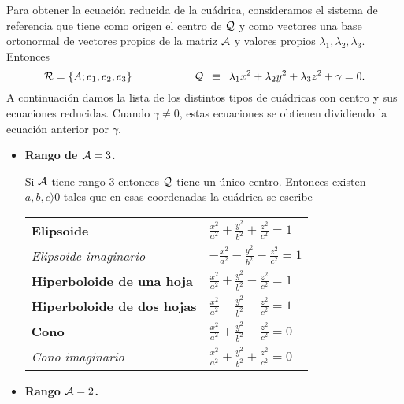 \documentclass[11pt, a4paper]{article}
\newif\IfInSansMode
\theoremstyle{theorem-style}
\theoremstyle{definition-style}
\theoremstyle{remark-style}
\theoremstyle{example-style}
\begin{document}
Para obtener la ecuaci\'on reducida de la cu\'adrica, consideramos el sistema de referencia que tiene como origen el centro de $\cal Q$ y como vectores una base ortonormal de vectores propios de la matriz $\cal A$ y valores propios $\lambda_1,\lambda_2,\lambda_3$. Entonces
\[
{\cal R} =\{A; {e}_1, {e}_2, {e}_3 \}
\hspace{2cm}
{\cal Q} \, \, \, \equiv \, \, \, \lambda_1 {x}^2 +\lambda_2 {y}^2 +\lambda_3 {z}^2 +
{\gamma} = 0.
\]
A continuaci\'on damos la lista de los distintos tipos de cu\'adricas con centro y  sus ecuaciones reducidas. Cuando ${\gamma}\neq 0$, estas ecuaciones se obtienen dividiendo la ecuaci\'on anterior por ${\gamma}$. 

\begin{itemize}
	
\item
{ {\bf Rango de ${\cal A} = 3$.}} 

\vspace{.3cm}

Si $\cal A$ tiene rango $3$ entonces $\cal Q$ tiene un \'unico centro.
Entonces existen $a,b,c\rangle 0$ tales que en esas coordenadas la cu\'adrica se escribe 


\begin{tabular}{ll}
{\bf  Elipsoide} \hspace{5cm} & 
$
\frac{{x}^2}{a^2} + \frac{{y}^2}{b^2}+\frac{{z}^2}{c^2} = 1
$
\vspace{.5cm}
\\
{\it Elipsoide imaginario}  &
$
-\frac{{x}^2}{a^2} - \frac{{y}^2}{b^2} - \frac{{z}^2}{c^2} = 1
$
\vspace{.5cm}
\\
{\bf  Hiperboloide de una hoja}  &
$
\frac{{x}^2}{a^2} + \frac{{y}^2}{b^2}-\frac{{z}^2}{c^2} = 1
$
\vspace{.5cm}
\\
{\bf  Hiperboloide de dos hojas} &
$
\frac{{x}^2}{a^2} - \frac{{y}^2}{b^2}-\frac{{z}^2}{c^2} = 1
$
\vspace{.5cm}
\\
{\bf  Cono}  &
$
\frac{{x}^2}{a^2} + \frac{{y}^2}{b^2}-\frac{{z}^2}{c^2} = 0
$
\vspace{.5cm}
\\
{\it Cono imaginario}  &
$
\frac{{x}^2}{a^2} + \frac{{y}^2}{b^2}+\frac{{z}^2}{c^2}=0
$
\vspace{.4cm}
\end{tabular}



\item {\bf Rango ${\cal A}=2$.} 



\end{itemize}
\end{document}
